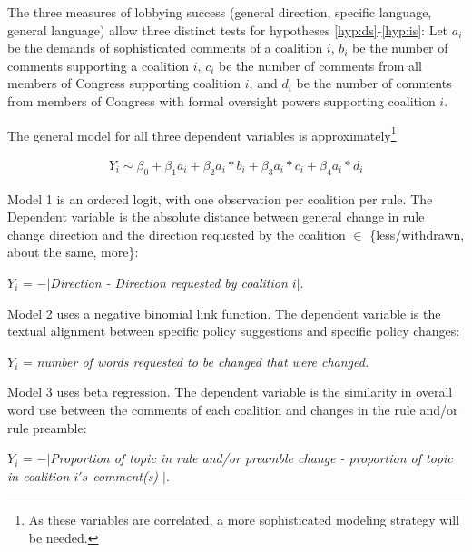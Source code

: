 The three measures of lobbying success (general direction, specific language, general language) allow three distinct tests for hypotheses \ref{hyp:ds}-\ref{hyp:is}:
Let $a_i$ be the demands of sophisticated comments of a coalition $i$, $b_i$ be the number of comments supporting a coalition $i$, $c_i$ be the number of comments from all members of Congress supporting coalition $i$, and $d_i$ be the number of comments from members of Congress with formal oversight powers supporting coalition $i$.

The general model for all three dependent variables is approximately\footnote{As these variables are correlated, a more sophisticated modeling strategy will be needed.} 

\begin{align}
Y_i \sim \beta_0  + 
\beta_1a_i + \beta_2a_i*b_i + \beta_3a_i*c_i + \beta_4a_i*d_i
\end{align}

Model 1 is an ordered logit, with one observation per coalition per rule. 
The Dependent variable is the absolute distance between general change in rule change direction and the direction requested by the coalition $\in$ \{less/withdrawn, about the same, more\}: 

$Y_i$ =
\textit{$-|$Direction - Direction requested by coalition $ i |$}.

Model 2 uses a negative binomial link function.
The dependent variable is the textual alignment between specific policy suggestions and specific policy changes: 

$Y_i$ = \textit{number of words requested to be changed that were changed.}

Model 3 uses beta regression. The dependent variable is the similarity in overall word use between the comments of each coalition and changes in the rule and/or rule preamble:

$Y_i$ = \textit{$-|$Proportion of topic in rule and/or preamble change - proportion of topic in coalition $i's$ comment(s) $|$}.




